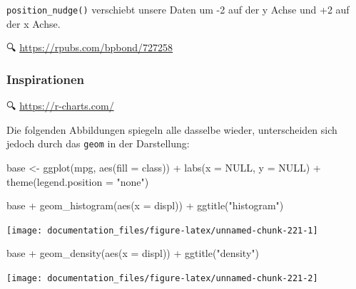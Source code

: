 \documentclass[
]{article}
\newenvironment{Shaded}{\begin{snugshade}}{\end{snugshade}}
\newcommand{\AttributeTok}[1]{\textcolor[rgb]{0.77,0.63,0.00}{#1}}
\newcommand{\ConstantTok}[1]{\textcolor[rgb]{0.00,0.00,0.00}{#1}}
\newcommand{\FunctionTok}[1]{\textcolor[rgb]{0.00,0.00,0.00}{#1}}
\newcommand{\NormalTok}[1]{#1}
\newcommand{\OtherTok}[1]{\textcolor[rgb]{0.56,0.35,0.01}{#1}}
\newcommand{\SpecialCharTok}[1]{\textcolor[rgb]{0.00,0.00,0.00}{#1}}
\newcommand{\StringTok}[1]{\textcolor[rgb]{0.31,0.60,0.02}{#1}}
\begin{document}
\texttt{position\_nudge()} verschiebt unsere Daten um -2 auf der y Achse und +2 auf der x Achse.

🔍 \url{https://rpubs.com/bpbond/727258}

\hypertarget{inspirationen}{%
\subsubsection{Inspirationen}\label{inspirationen}}

🔍 \url{https://r-charts.com/}

Die folgenden Abbildungen spiegeln alle dasselbe wieder, unterscheiden sich jedoch durch das \texttt{geom} in der Darstellung:

\begin{Shaded}
\begin{Highlighting}[]
\NormalTok{base }\OtherTok{\textless{}{-}} \FunctionTok{ggplot}\NormalTok{(mpg, }\FunctionTok{aes}\NormalTok{(}\AttributeTok{fill =}\NormalTok{ class)) }\SpecialCharTok{+}
  \FunctionTok{labs}\NormalTok{(}\AttributeTok{x =} \ConstantTok{NULL}\NormalTok{, }\AttributeTok{y =} \ConstantTok{NULL}\NormalTok{) }\SpecialCharTok{+}
  \FunctionTok{theme}\NormalTok{(}\AttributeTok{legend.position =} \StringTok{"none"}\NormalTok{)}

\NormalTok{base }\SpecialCharTok{+} \FunctionTok{geom\_histogram}\NormalTok{(}\FunctionTok{aes}\NormalTok{(}\AttributeTok{x =}\NormalTok{ displ)) }\SpecialCharTok{+} \FunctionTok{ggtitle}\NormalTok{(}\StringTok{"histogram"}\NormalTok{)}
\end{Highlighting}
\end{Shaded}

\begin{center}\texttt{[image: documentation\_files/figure-latex/unnamed-chunk-221-1]} \end{center}

\begin{Shaded}
\begin{Highlighting}[]
\NormalTok{base }\SpecialCharTok{+} \FunctionTok{geom\_density}\NormalTok{(}\FunctionTok{aes}\NormalTok{(}\AttributeTok{x =}\NormalTok{ displ)) }\SpecialCharTok{+} \FunctionTok{ggtitle}\NormalTok{(}\StringTok{"density"}\NormalTok{)}
\end{Highlighting}
\end{Shaded}

\begin{center}\texttt{[image: documentation\_files/figure-latex/unnamed-chunk-221-2]} \end{center}
\end{document}
